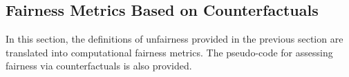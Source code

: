 \documentclass[letterpaper]{article} %
\begin{document}

\subsection{Fairness Metrics Based on Counterfactuals}

% 

In this section, the definitions of unfairness provided in the previous section are translated into computational fairness metrics. The pseudo-code for assessing fairness via counterfactuals is also provided.
\end{document}
